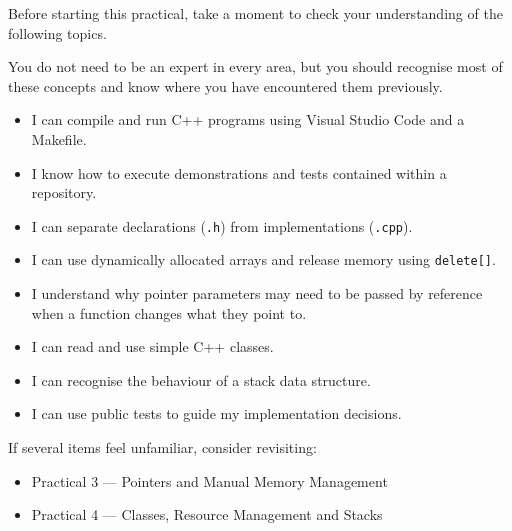 \documentclass{csc2059practical}
\begin{document}


Before starting this practical, take a moment to check your understanding of the
following topics.

You do not need to be an expert in every area, but you should recognise most of
these concepts and know where you have encountered them previously.

\begin{itemize}

\item I can compile and run C++ programs using Visual Studio Code and a
Makefile.

\item I know how to execute demonstrations and tests contained within a
repository.

\item I can separate declarations (\texttt{.h}) from implementations
(\texttt{.cpp}).

\item I can use dynamically allocated arrays and release memory using
\texttt{delete[]}.

\item I understand why pointer parameters may need to be passed by reference
when a function changes what they point to.

\item I can read and use simple C++ classes.

\item I can recognise the behaviour of a stack data structure.

\item I can use public tests to guide my implementation decisions.

\end{itemize}

If several items feel unfamiliar, consider revisiting:

\begin{itemize}

\item Practical 3 --- Pointers and Manual Memory Management

\item Practical 4 --- Classes, Resource Management and Stacks

\end{itemize}
\end{document}
